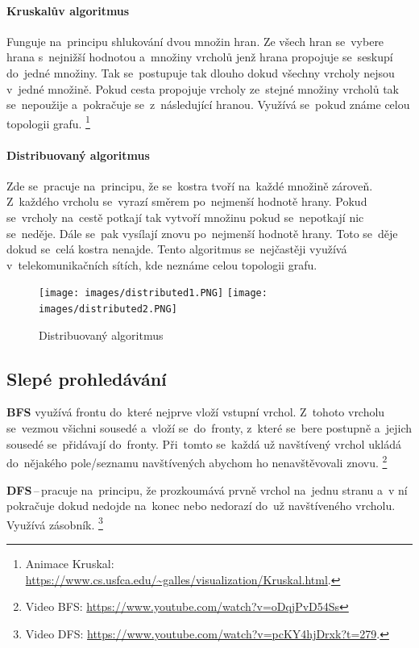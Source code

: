 \paragraph{Kruskalův algoritmus} Funguje na~principu shlukování dvou množin hran. Ze všech hran se~vybere hrana s~nejnižší hodnotou a~množiny vrcholů jenž hrana propojuje se~seskupí do~jedné množiny. Tak se~postupuje tak dlouho dokud všechny vrcholy nejsou v~jedné množině. Pokud cesta propojuje vrcholy ze~stejné množiny vrcholů tak se~nepoužije a~pokračuje se~z~následující hranou. Využívá se~pokud známe celou topologii grafu.%
\footnote{Animace Kruskal: \url{https://www.cs.usfca.edu/~galles/visualization/Kruskal.html}.}

\paragraph{Distribuovaný algoritmus} Zde se~pracuje na~principu, že se~kostra tvoří na~každé množině zároveň. Z~každého vrcholu se~vyrazí směrem po~nejmenší hodnotě hrany. Pokud se~vrcholy na~cestě potkají tak vytvoří množinu pokud se~nepotkají nic se~neděje. Dále se~pak vysílají znovu po~nejmenší hodnotě hrany. Toto se~děje dokud se~celá kostra nenajde. Tento algoritmus se~nejčastěji využívá v~telekomunikačních sítích, kde neznáme celou topologii grafu.

\begin{figure}[ht]
	\centering
	\texttt{[image: images/distributed1.PNG]}
	\texttt{[image: images/distributed2.PNG]}
	\caption{Distribuovaný algoritmus}
	\label{distributed}
\end{figure}

\subsection{Slepé prohledávání}

\textbf{BFS} využívá frontu do~které nejprve vloží vstupní vrchol. Z~tohoto vrcholu se~vezmou všichni sousedé a~vloží se~do~fronty, z~které se~bere postupně a~jejich sousedé se~přidávají do~fronty. Při~tomto se~každá už navštívený vrchol ukládá do~nějakého pole/seznamu navštívených abychom ho nenavštěvovali znovu.%
\footnote{Video BFS: \url{https://www.youtube.com/watch?v=oDqjPvD54Ss}}

\textbf{DFS}\,--\,pracuje na~principu, že prozkoumává prvně vrchol na~jednu stranu a~v ní pokračuje dokud nedojde na~konec nebo nedorazí do~už navštíveného vrcholu. Využívá zásobník.%
\footnote{Video DFS: \url{https://www.youtube.com/watch?v=pcKY4hjDrxk?t=279}.}

